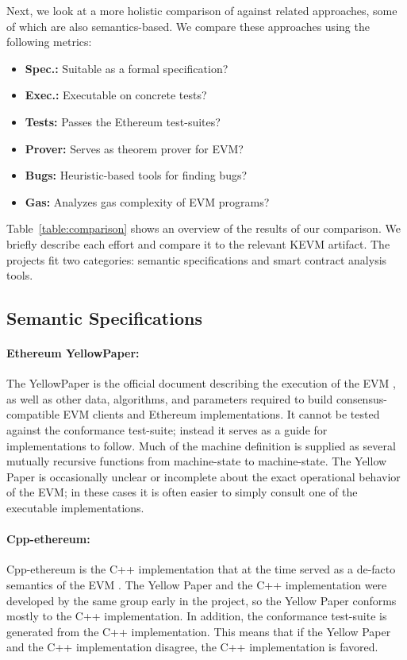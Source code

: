 Next, we look at a more holistic comparison of \KEVM{} against related approaches,
some of which are also semantics-based. We compare these approaches using the
following metrics:
\begin{itemize}
    \item \textbf{Spec.:} Suitable as a formal specification?
    \item \textbf{Exec.:} Executable on concrete tests?
    \item \textbf{Tests:} Passes the Ethereum test-suites?
    \item \textbf{Prover:} Serves as theorem prover for EVM?
    \item \textbf{Bugs:} Heuristic-based tools for finding bugs?
    \item \textbf{Gas:} Analyzes gas complexity of EVM programs?
\end{itemize}

Table~\ref{table:comparison} shows an overview of the results of our comparison.
We briefly describe each effort and compare it to the relevant KEVM artifact.
The projects fit two categories: semantic specifications and smart contract analysis tools.


\subsection{Semantic Specifications}

\paragraph{Ethereum YellowPaper:}
The YellowPaper is the official document describing the execution of the EVM
\cite{WoodReport14},
    as well as other data, algorithms,
    and parameters required to build consensus-compatible
    EVM clients and Ethereum implementations.
It cannot be tested against the conformance test-suite;
instead it serves as a guide for implementations to follow.
Much of the machine definition is supplied as several mutually
recursive functions from machine-state to machine-state.
The Yellow Paper is occasionally unclear or incomplete about
the exact operational behavior of the EVM;
in these cases it is often easier to simply consult one of the executable implementations.

\paragraph{Cpp-ethereum:}
Cpp-ethereum is the
C++ implementation that at the time served as a de-facto semantics of the EVM
\cite{CppEthereumUrl}.
The Yellow Paper and the C++ implementation were
developed by the same group early in the project,
          so the Yellow Paper conforms mostly to the C++ implementation.
In addition, the conformance test-suite is generated from the C++ implementation.
This means that if the Yellow Paper and the C++ implementation disagree,
     the C++ implementation is favored.

